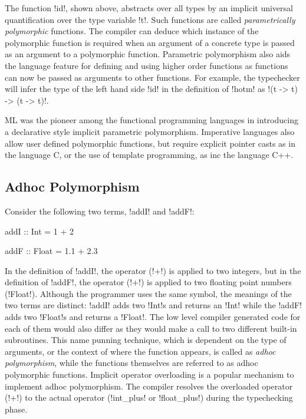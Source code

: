 \documentclass[screen,nonacm,manuscript,review]{acmart} %
\begin{document}
The function !id!, shown above, abstracts over all types by an implicit universal
quantification over the type variable !t!. Such functions are called \emph{parametrically
polymorphic} functions\cite{strachey_fundamental_2000}. The compiler
can deduce which instance of the polymorphic function is required when
an argument of a concrete type is passed as an argument to a
polymorphic function. Parametric polymorphism also aids the language feature for defining and using
higher order functions as functions can now be passed as arguments to other
functions. For example, the typechecker will infer the type of the
left hand side !id! in the definition of !hotm! as !(t -> t) -> (t -> t)!.

ML\cite{milner_logic_1975,milner_theory_1978}
was the pioneer among the functional programming languages in
introducing a declarative style implicit parametric polymorphism.
Imperative languages also allow user defined
polymorphic functions, but require explicit pointer casts as in the
language C, or the use of template programming, as inc the language C++.

\subsection{Adhoc Polymorphism}
Consider the following two terms, !addI! and !addF!:

\begin{minipage}[ht]{0.5\linewidth}
\begin{CenteredBox}
\begin{code}
addI :: Int = 1 + 2
\end{code}
\end{CenteredBox}
\end{minipage}%
\begin{minipage}[ht]{0.5\linewidth}
\begin{CenteredBox}
\begin{code}
addF :: Float = 1.1 + 2.3
\end{code}
\end{CenteredBox}
\end{minipage}

In the definition of !addI!, the operator (!+!) is applied to two
integers, but in the definition of !addF!, the operator (!+!) is
applied to two floating point numbers (!Float!). Although the
programmer uses the same symbol, the meanings of the two terms are
distinct: !addI! adds two !Int!s and returns an !Int! while the !addF!
adds two !Float!s and returns a !Float!. The low level compiler generated code
for each of them would also differ as they would make a call to two
different built-in subroutines. This name punning technique, which is dependent on the
type of arguments, or the context of where the function appears, is called as \emph{adhoc
polymorphism}\cite{strachey_fundamental_2000}, while the functions
themselves are referred to as adhoc polymorphic functions. Implicit
operator overloading is a popular mechanism to implement adhoc
polymorphism. The compiler resolves the overloaded operator (!+!) to
the actual operator (!int_plus! or !float_plus!) during the typechecking phase.
\end{document}
